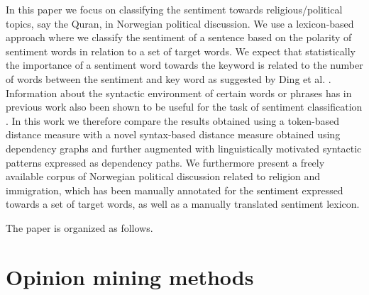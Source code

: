 \documentclass[11pt]{article}
\begin{document}
In this paper we focus on classifying the sentiment towards
religious/political topics, say the Quran, in Norwegian political
discussion. We use a lexicon-based approach where we classify the
sentiment of a sentence based on the polarity of sentiment words in
relation to a set of target words. We expect that statistically the
importance of a sentiment word towards the keyword is related to the
number of words between the sentiment and key word as suggested by
Ding et al. .  Information about the syntactic
environment of certain words or phrases has in previous work also been
shown to be useful for the task of sentiment classification
\cite{Wil:Wie:Hof:09,Jiang11}. In this work we therefore compare the
results obtained using a token-based distance measure with a novel
syntax-based distance measure obtained using dependency graphs and
further augmented with linguistically motivated syntactic patterns
expressed as dependency paths.  We furthermore present a freely
available corpus of Norwegian political discussion related to religion
and immigration, which has been manually annotated for the sentiment
expressed towards a set of target words, as well as a manually translated sentiment lexicon.


The paper is organized as follows. 

\section{Opinion mining methods}
\label{sec:om}
\end{document}

